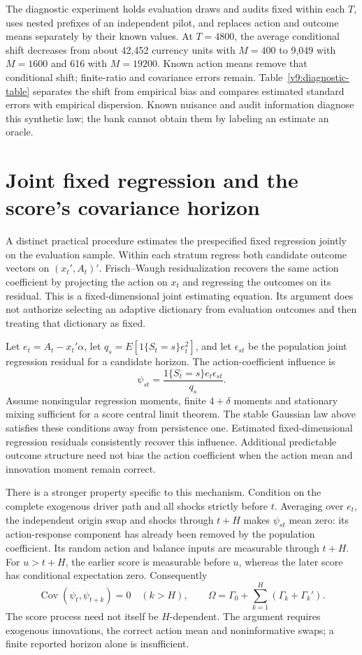 The diagnostic experiment holds evaluation draws and audits fixed within each
$T$, uses nested prefixes of an independent pilot, and replaces action and
outcome means separately by their known values. At $T=4800$, the average
conditional shift decreases from about 42,452 currency units with $M=400$ to
9,049 with $M=1600$ and 616 with $M=19200$. Known action means remove that
conditional shift; finite-ratio and covariance errors remain.
Table~\ref{v9:diagnostic-table} separates the shift from empirical bias and
compares estimated standard errors with empirical dispersion. Known nuisance
and audit information diagnose this synthetic law; the bank cannot obtain
them by labeling an estimate an oracle.

\section{Joint fixed regression and the score's covariance horizon}
\label{v9:covariance}

A distinct practical procedure estimates the prespecified fixed regression
jointly on the evaluation sample. Within each stratum regress both candidate
outcome vectors on $(x_t',A_t)'$. Frisch--Waugh residualization recovers the
same action coefficient by projecting the action on $x_t$ and regressing the
outcomes on its residual. This is a fixed-dimensional joint estimating
equation. Its argument does not authorize selecting an adaptive dictionary
from evaluation outcomes and then treating that dictionary as fixed.

Let $e_t=A_t-x_t'\alpha$, let
$q_s=E[1\{S_t=s\}e_t^2]$, and let $\epsilon_{st}$ be the population joint
regression residual for a candidate horizon. The action-coefficient influence is
\[
 \psi_{st}=\frac{1\{S_t=s\}e_t\epsilon_{st}}{q_s}.
\]
Assume nonsingular regression moments, finite $4+\delta$ moments and stationary
mixing sufficient for a score central limit theorem. The stable Gaussian law
above satisfies these conditions away from persistence one. Estimated
fixed-dimensional regression residuals consistently recover this influence.
Additional predictable outcome structure need not bias the action coefficient
when the action mean and innovation moment remain correct.

There is a stronger property specific to this mechanism. Condition on the
complete exogenous driver path and all shocks strictly before $t$. Averaging
over $e_t$, the independent origin swap and shocks through $t+H$ makes
$\psi_{st}$ mean zero: its action-response component has already been removed
by the population coefficient. Its random action and balance inputs are
measurable through $t+H$. For $u>t+H$, the earlier score is measurable before
$u$, whereas the later score has conditional expectation zero. Consequently
\begin{equation}
 \operatorname{Cov}(\psi_t,\psi_{t+k})=0\quad(k>H),\qquad
 \Omega=\Gamma_0+\sum_{k=1}^{H}(\Gamma_k+\Gamma_k'). \label{v9:horizon}
\end{equation}
The score process need not itself be $H$-dependent. The argument requires
exogenous innovations, the correct action mean and noninformative swaps;
a finite reported horizon alone is insufficient.

